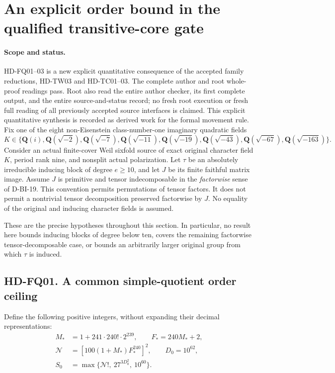 \section{An explicit order bound in the qualified transitive-core gate}
\label{sec:explicit-inducing-order}

\paragraph{Scope and status.}
HD-FQ01--03 is a new explicit quantitative consequence of the accepted
family reductions, HD-TW03 and HD-TC01--03.  The complete author and root whole-proof readings pass. Root also read
the entire author checker, its first complete output, and the entire
source-and-status record; no fresh root execution or fresh full
reading of all previously accepted source interfaces is claimed.
This explicit quantitative synthesis is recorded as derived work
for the formal movement rule.
Fix one of the eight non-Eisenstein class-number-one imaginary quadratic
fields
\[
 K\in\{\mathbf Q(i),\mathbf Q(\sqrt{-2}),\mathbf Q(\sqrt{-7}),
 \mathbf Q(\sqrt{-11}),\mathbf Q(\sqrt{-19}),
 \mathbf Q(\sqrt{-43}),\mathbf Q(\sqrt{-67}),
 \mathbf Q(\sqrt{-163})\}.
 \tag{FQ.1}
\]
Consider an actual finite-cover Weil sixfold source of exact original
character field $K$, period rank nine, and nonsplit actual polarization.
Let $\tau$ be an absolutely irreducible inducing block of degree $e\ge10$,
and let $J$ be its finite faithful matrix image.  Assume $J$ is primitive
and tensor indecomposable in the \emph{factorwise} sense of D-BI-19.
This convention permits permutations of tensor factors.  It does not
permit a nontrivial tensor decomposition preserved factorwise by $J$.
No equality of the original and inducing character fields is assumed.

These are the precise hypotheses throughout this section.  In particular,
no result here bounds inducing blocks of degree below ten, covers the
remaining factorwise tensor-decomposable case, or bounds an arbitrarily
larger original group from which $\tau$ is induced.

\subsection*{HD-FQ01. A common simple-quotient order ceiling}

Define the following positive integers, without expanding their decimal
representations:
\[
 \begin{split}
 M_*&=1+241\cdot240!\cdot2^{239},\qquad F_*=240M_*+2,\\
 \mathcal N&=[100(1+M_*)F_*^{240}]^2,\qquad D_0=10^{62},\\
 S_0&=\max\{\mathcal N!,\ 27^{3D_0^2},\ 10^{60}\}.
 \end{split}                                                   \tag{FQ.2}
\]

